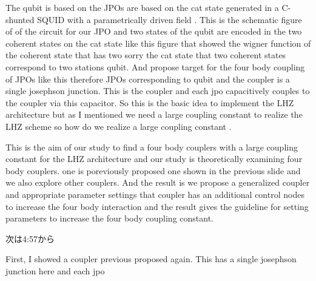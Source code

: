 The qubit is based on the JPOs are based on the cat state generated in a C-shunted SQUID with a parametrically driven field .
This is the schematic figure of of the circuit for our JPO and two states of the qubit are encoded in the two coherent states on the cat state like this figure that showed the wigner function of the coherent state that has two sorry the cat state that two coherent states correspond to two stations qubit.
And propose target for the four body coupling of JPOs like this therefore JPOs corresponding to qubit and the coupler is a single josephson junction.
This is the coupler and each jpo capacitively couples to the coupler via this capacitor.
So this is the basic idea to implement the LHZ architecture but as I mentioned we need a large coupling constant to realize the LHZ scheme so how do we realize a large coupling constant .

This is the aim of our study to find a four body couplers with a large coupling constant for the LHZ architecture and our study is theoretically examining four body couplers.
one is poreviously proposed one shown in the previous slide and we also explore other couplers.
And the result is we propose a generalized coupler and appropriate parameter settings that coupler has an additional control nodes to increase the four body interaction and the result gives the guideline for setting parameters to increase the four body coupling constant.

次は4:57から


First, I showed a coupler previous proposed again.
This has a single josephson junction here and each jpo
